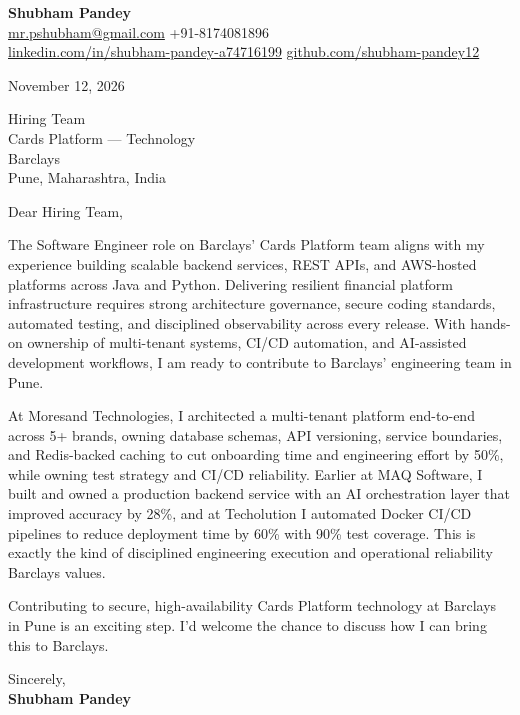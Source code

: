 \documentclass[a4paper,11pt]{article}
\begin{document}
\textbf{\Large Shubham Pandey}\\
\href{mailto:mr.pshubham@gmail.com}{mr.pshubham@gmail.com} \quad +91-8174081896\\
\href{https://www.linkedin.com/in/shubham-pandey-a74716199/}{linkedin.com/in/shubham-pandey-a74716199} \quad
\href{https://github.com/shubham-pandey12}{github.com/shubham-pandey12}

\vspace{1em}
November 12, 2026

\vspace{1em}
Hiring Team\\
Cards Platform --- Technology\\
Barclays\\
Pune, Maharashtra, India

\vspace{1em}
Dear Hiring Team,

The Software Engineer role on Barclays' Cards Platform team aligns with my experience building scalable backend services, REST APIs, and AWS-hosted platforms across Java and Python. Delivering resilient financial platform infrastructure requires strong architecture governance, secure coding standards, automated testing, and disciplined observability across every release. With hands-on ownership of multi-tenant systems, CI/CD automation, and AI-assisted development workflows, I am ready to contribute to Barclays' engineering team in Pune.

At Moresand Technologies, I architected a multi-tenant platform end-to-end across 5+ brands, owning database schemas, API versioning, service boundaries, and Redis-backed caching to cut onboarding time and engineering effort by 50\%, while owning test strategy and CI/CD reliability. Earlier at MAQ Software, I built and owned a production backend service with an AI orchestration layer that improved accuracy by 28\%, and at Techolution I automated Docker CI/CD pipelines to reduce deployment time by 60\% with 90\% test coverage. This is exactly the kind of disciplined engineering execution and operational reliability Barclays values.

Contributing to secure, high-availability Cards Platform technology at Barclays in Pune is an exciting step. I'd welcome the chance to discuss how I can bring this to Barclays.

\vspace{1em}
Sincerely,\\[0.5em]
\textbf{Shubham Pandey}
\end{document}
